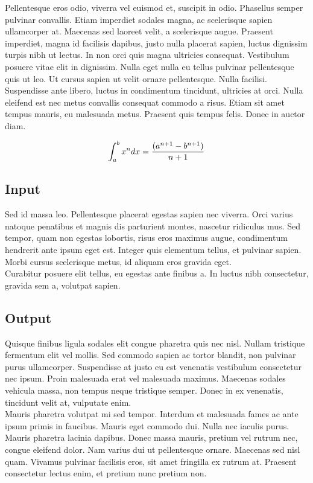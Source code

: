 \noindent
Pellentesque eros odio, viverra vel euismod et, suscipit in odio. Phasellus semper pulvinar convallis. Etiam imperdiet sodales magna, ac scelerisque sapien ullamcorper at. Maecenas sed laoreet velit, a scelerisque augue. Praesent imperdiet, magna id facilisis dapibus, justo nulla placerat sapien, luctus dignissim turpis nibh ut lectus. In non orci quis magna ultricies consequat. Vestibulum posuere vitae elit in dignissim. Nulla eget nulla eu tellus pulvinar pellentesque quis ut leo. Ut cursus sapien ut velit ornare pellentesque. Nulla facilisi. Suspendisse ante libero, luctus in condimentum tincidunt, ultricies at orci. Nulla eleifend est nec metus convallis consequat commodo a risus. Etiam sit amet tempus mauris, eu malesuada metus. Praesent quis tempus felis. Donec in auctor diam.

\begin{equation}
    \Large \int_{a}^{b} x^n dx = \frac{(a^{n+1}-b^{n+1})}{n+1}
\end{equation}

\subsection*{Input}
\noindent
Sed id massa leo. Pellentesque placerat egestas sapien nec viverra. Orci varius natoque penatibus et magnis dis parturient montes, nascetur ridiculus mus. Sed tempor, quam non egestas lobortis, risus eros maximus augue, condimentum hendrerit ante ipsum eget est. Integer quis elementum tellus, et pulvinar sapien. Morbi cursus scelerisque metus, id aliquam eros gravida eget.\\[0.3cm]
Curabitur posuere elit tellus, eu egestas ante finibus a. In luctus nibh consectetur, gravida sem a, volutpat sapien.

\subsection*{Output}
\noindent
Quisque finibus ligula sodales elit congue pharetra quis nec nisl. Nullam tristique fermentum elit vel mollis. Sed commodo sapien ac tortor blandit, non pulvinar purus ullamcorper. Suspendisse at justo eu est venenatis vestibulum consectetur nec ipsum. Proin malesuada erat vel malesuada maximus. Maecenas sodales vehicula massa, non tempus neque tristique semper. Donec in ex venenatis, tincidunt velit at, vulputate enim.\\[0.3cm]
Mauris pharetra volutpat mi sed tempor. Interdum et malesuada fames ac ante ipsum primis in faucibus. Mauris eget commodo dui. Nulla nec iaculis purus. Mauris pharetra lacinia dapibus. Donec massa mauris, pretium vel rutrum nec, congue eleifend dolor. Nam varius dui ut pellentesque ornare. Maecenas sed nisl quam. Vivamus pulvinar facilisis eros, sit amet fringilla ex rutrum at. Praesent consectetur lectus enim, et pretium nunc pretium non.

